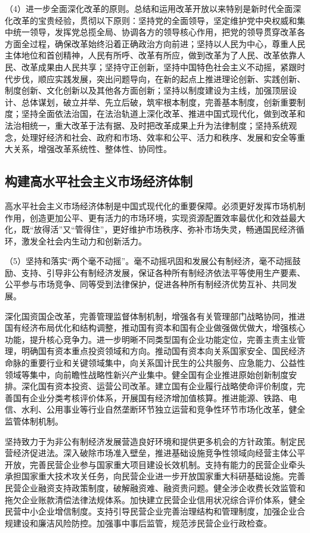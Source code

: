     （4）进一步全面深化改革的原则。总结和运用改革开放以来特别是新时代全面深化改革的宝贵经验，贯彻以下原则：坚持党的全面领导，坚定维护党中央权威和集中统一领导，发挥党总揽全局、协调各方的领导核心作用，把党的领导贯穿改革各方面全过程，确保改革始终沿着正确政治方向前进；坚持以人民为中心，尊重人民主体地位和首创精神，人民有所呼、改革有所应，做到改革为了人民、改革依靠人民、改革成果由人民共享；坚持守正创新，坚持中国特色社会主义不动摇，紧跟时代步伐，顺应实践发展，突出问题导向，在新的起点上推进理论创新、实践创新、制度创新、文化创新以及其他各方面创新；坚持以制度建设为主线，加强顶层设计、总体谋划，破立并举、先立后破，筑牢根本制度，完善基本制度，创新重要制度；坚持全面依法治国，在法治轨道上深化改革、推进中国式现代化，做到改革和法治相统一，重大改革于法有据、及时把改革成果上升为法律制度；坚持系统观念，处理好经济和社会、政府和市场、效率和公平、活力和秩序、发展和安全等重大关系，增强改革系统性、整体性、协同性。

    \subsection{构建高水平社会主义市场经济体制}

    高水平社会主义市场经济体制是中国式现代化的重要保障。必须更好发挥市场机制作用，创造更加公平、更有活力的市场环境，实现资源配置效率最优化和效益最大化，既“放得活”又“管得住”，更好维护市场秩序、弥补市场失灵，畅通国民经济循环，激发全社会内生动力和创新活力。

    （5）坚持和落实“两个毫不动摇”。毫不动摇巩固和发展公有制经济，毫不动摇鼓励、支持、引导非公有制经济发展，保证各种所有制经济依法平等使用生产要素、公平参与市场竞争、同等受到法律保护，促进各种所有制经济优势互补、共同发展。

    深化国资国企改革，完善管理监督体制机制，增强各有关管理部门战略协同，推进国有经济布局优化和结构调整，推动国有资本和国有企业做强做优做大，增强核心功能，提升核心竞争力。进一步明晰不同类型国有企业功能定位，完善主责主业管理，明确国有资本重点投资领域和方向。推动国有资本向关系国家安全、国民经济命脉的重要行业和关键领域集中，向关系国计民生的公共服务、应急能力、公益性领域等集中，向前瞻性战略性新兴产业集中。健全国有企业推进原始创新制度安排。深化国有资本投资、运营公司改革。建立国有企业履行战略使命评价制度，完善国有企业分类考核评价体系，开展国有经济增加值核算。推进能源、铁路、电信、水利、公用事业等行业自然垄断环节独立运营和竞争性环节市场化改革，健全监管体制机制。

    坚持致力于为非公有制经济发展营造良好环境和提供更多机会的方针政策。制定民营经济促进法。深入破除市场准入壁垒，推进基础设施竞争性领域向经营主体公平开放，完善民营企业参与国家重大项目建设长效机制。支持有能力的民营企业牵头承担国家重大技术攻关任务，向民营企业进一步开放国家重大科研基础设施。完善民营企业融资支持政策制度，破解融资难、融资贵问题。健全涉企收费长效监管和拖欠企业账款清偿法律法规体系。加快建立民营企业信用状况综合评价体系，健全民营中小企业增信制度。支持引导民营企业完善治理结构和管理制度，加强企业合规建设和廉洁风险防控。加强事中事后监管，规范涉民营企业行政检查。

